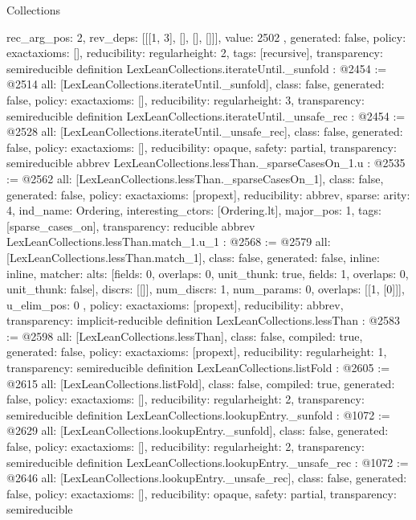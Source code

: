 \begin{lexlean}{Collections}
\begin{coremodule}
{{    rec_arg_pos: 2,
    rev_deps: [[[1, 3], [], [], []]],
    value: 2502
  },
  generated: false,
  policy: exact{axioms: []},
  reducibility: regular{height: 2},
  tags: [recursive],
  transparency: semireducible
}
definition LexLeanCollections.iterateUntil._sunfold : @2454 := @2514 {
  all: [LexLeanCollections.iterateUntil._sunfold],
  class: false,
  generated: false,
  policy: exact{axioms: []},
  reducibility: regular{height: 3},
  transparency: semireducible
}
definition LexLeanCollections.iterateUntil._unsafe_rec : @2454 := @2528 {
  all: [LexLeanCollections.iterateUntil._unsafe_rec],
  class: false,
  generated: false,
  policy: exact{axioms: []},
  reducibility: opaque{},
  safety: partial,
  transparency: semireducible
}
abbrev LexLeanCollections.lessThan._sparseCasesOn_1.{u} : @2535 := @2562 {
  all: [LexLeanCollections.lessThan._sparseCasesOn_1],
  class: false,
  generated: false,
  policy: exact{axioms: [propext]},
  reducibility: abbrev{},
  sparse: {arity: 4, ind_name: Ordering, interesting_ctors: [Ordering.lt], major_pos: 1},
  tags: [sparse_cases_on],
  transparency: reducible
}
abbrev LexLeanCollections.lessThan.match_1.{u_1} : @2568 := @2579 {
  all: [LexLeanCollections.lessThan.match_1],
  class: false,
  generated: false,
  inline: inline,
  matcher: {
    alts: [{fields: 0, overlaps: 0, unit_thunk: true}, {fields: 1, overlaps: 0, unit_thunk: false}],
    discrs: [[]],
    num_discrs: 1,
    num_params: 0,
    overlaps: [[1, [0]]],
    u_elim_pos: 0
  },
  policy: exact{axioms: [propext]},
  reducibility: abbrev{},
  transparency: implicit-reducible
}
definition LexLeanCollections.lessThan : @2583 := @2598 {
  all: [LexLeanCollections.lessThan],
  class: false,
  compiled: true,
  generated: false,
  policy: exact{axioms: [propext]},
  reducibility: regular{height: 1},
  transparency: semireducible
}
definition LexLeanCollections.listFold : @2605 := @2615 {
  all: [LexLeanCollections.listFold],
  class: false,
  compiled: true,
  generated: false,
  policy: exact{axioms: []},
  reducibility: regular{height: 2},
  transparency: semireducible
}
definition LexLeanCollections.lookupEntry._sunfold : @1072 := @2629 {
  all: [LexLeanCollections.lookupEntry._sunfold],
  class: false,
  generated: false,
  policy: exact{axioms: []},
  reducibility: regular{height: 2},
  transparency: semireducible
}
definition LexLeanCollections.lookupEntry._unsafe_rec : @1072 := @2646 {
  all: [LexLeanCollections.lookupEntry._unsafe_rec],
  class: false,
  generated: false,
  policy: exact{axioms: []},
  reducibility: opaque{},
  safety: partial,
  transparency: semireducible
}
\end{coremodule}
\end{lexlean}
